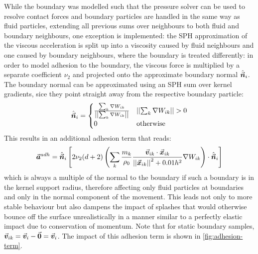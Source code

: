 \horizontalspacer

While the boundary was modelled such that the pressure solver can be used to resolve contact forces and boundary particles are handled in the same way as fluid particles, extending all previous sums over neighbours to both fluid and boundary neighbours, one exception is implemented: the SPH approximation of the viscous acceleration is split up into a viscosity caused by fluid neighbours and one caused by boundary neighbours, where the boundary is treated differently: in order to model adhesion to the boundary, the viscous force is multiplied by a separate coefficient $\nu_2$ and projected onto the approximate boundary normal $\hat{\vec{\bm{n}}}_i$. The boundary normal can be approximated using an SPH sum over kernel gradients, sice they point straight away from the respective boundary particle:
\begin{equation}
  \hat{\vec{\bm{n}}}_i  = \begin{cases}
    \frac{\sum_k \nabla W_{ik}}{\left|\left|\sum_k \nabla W_{ik}\right|\right|} & \left|\left|\sum_k \nabla W_{ik}\right|\right| > 0 \\
    0                                                        & \text{otherwise}
  \end{cases}
\end{equation}
This results in an additional adhesion term that reads:
\begin{equation}
  \vec{\bm{a}}^{adh}   = \hat{\vec{\bm{n}}}_i \left[2\nu_2(d+2) \left(\sum_k\frac{m_k}{\rho_0} \frac{\vec{\bm{v}}_{ik}\cdot\vec{\bm{x}}_{ik}}{\left|\left|\vec{\bm{x}}_{ik}\right|\right|^2 + 0.01h^2}\nabla W_{ik}\right)\cdot \hat{\vec{\bm{n}}}_i \right]
\end{equation}
which is always a multiple of the normal to the boundary if such a boundary is in the kernel support radius, therefore affecting only fluid particles at boundaries and only in the normal component of the movement. This leads not only to more stable behaviour but also dampens the impact of splashes that would otherwise bounce off the surface unrealistically in a manner similar to a perfectly elastic impact due to conservation of momentum. Note that for static boundary samples, $\vec{\bm{v}}_{ik} = \vec{\bm{v}}_i - \vec{\bm{0}} = \vec{\bm{v}}_i$. The impact of this adhesion term is shown in \autoref{fig:adhesion-term}.


